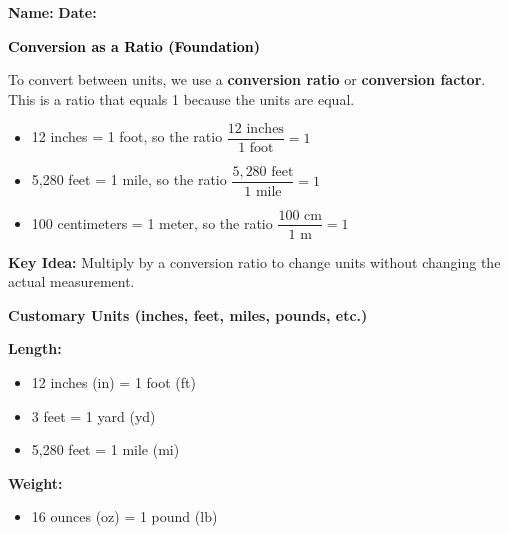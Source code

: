 \documentclass[12pt, letterpaper, fleqn]{article}
\begin{document}
\textbf{Name:} \underline{\hspace{5cm}}
\hfill
\textbf{Date:} \underline{\hspace{3cm}}\\

\begin{tcolorbox}[colback=customteal!20]
    \large\textcolor{black}{\textbf{Conversion as a Ratio (Foundation)}}
\end{tcolorbox}

\vspace{3mm}

\noindent
To convert between units, we use a \textbf{conversion ratio} or \textbf{conversion factor}. This is a ratio that equals 1 because the units are equal.

\vspace{0.8cm}

\begin{itemize}
    \item 12 inches = 1 foot, so the ratio $\dfrac{12 \text{ inches}}{1 \text{ foot}} = 1$
    \item 5,280 feet = 1 mile, so the ratio $\dfrac{5,280 \text{ feet}}{1 \text{ mile}} = 1$
    \item 100 centimeters = 1 meter, so the ratio $\dfrac{100 \text{ cm}}{1 \text{ m}} = 1$
\end{itemize}

\vspace{1cm}

\noindent
\textbf{Key Idea:} Multiply by a conversion ratio to change units without changing the actual measurement.

\vspace{1cm}



\begin{tcolorbox}[colback=white, colframe=black!50, boxrule=0.6pt, arc=4mm, left=6mm, right=6mm, top=5mm, bottom=5mm]

\textbf{Customary Units (inches, feet, miles, pounds, etc.)}

\medskip

\noindent
\textbf{Length:}
\begin{itemize}
    \item 12 inches (in) = 1 foot (ft)
    \item 3 feet = 1 yard (yd)
    \item 5,280 feet = 1 mile (mi)
\end{itemize}

\noindent
\textbf{Weight:}
\begin{itemize}
    \item 16 ounces (oz) = 1 pound (lb)
\end{itemize}

\end{tcolorbox}
\end{document}
